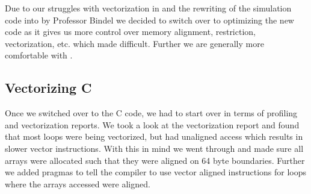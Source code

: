 Due to our struggles with vectorization in  and the rewriting of the simulation code into  by Professor Bindel we decided to switch over to optimizing the new  code as it gives us more control over memory alignment, restriction, vectorization, etc. which  made difficult. Further we are generally more comfortable with .

\subsection{Vectorizing C}

Once we switched over to the C code, we had to start over in terms of profiling and vectorization reports. We took a look at the vectorization report and found that most loops were being vectorized, but had unaligned access which results in slower vector instructions. With this in mind we went through and made sure all arrays were allocated such that they were aligned on 64 byte boundaries. Further we added pragmas to tell the compiler to use vector aligned instructions for loops where the arrays accessed were aligned.
